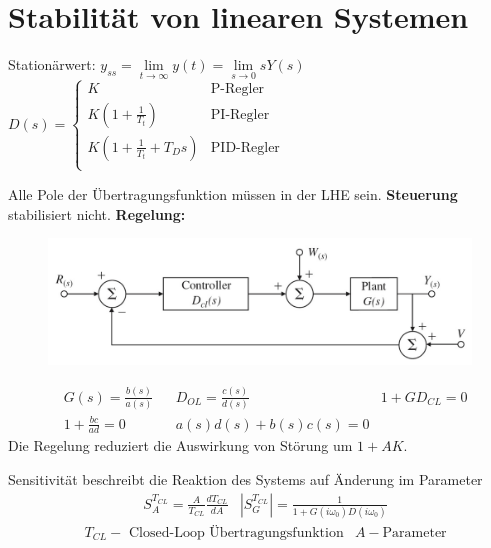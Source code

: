 \setcounter{section}{5}
\section{Stabilität von linearen Systemen}
\begin{tcolorbox}[colback=white!10!white,
                  colframe=green!30!black,
                  title=Stationäres Verhalten]
    Stationärwert: $y_{ss} = \lim\limits_{t \rightarrow \infty}y\left(t\right)
                           = \lim\limits_{s \rightarrow 0}sY\left(s\right)$ \\
    $D\left(s\right) = \begin{cases}
        K & \text{P-Regler} \\
        K\left(1+\frac{1}{T_t}\right) & \text{PI-Regler} \\
        K\left(1+\frac{1}{T_t}+T_Ds\right) & \text{PID-Regler} \\
    \end{cases}$
\end{tcolorbox}

\begin{tcolorbox}[colback=white!10!white,
                  colframe=green!30!black,
                  title=Stabilität]
    Alle Pole der Übertragungsfunktion müssen in der LHE sein.
    \textbf{Steuerung} stabilisiert nicht.
    \textbf{Regelung:}
    \begin{figure}[H]
        \centering
        \includegraphics[width=.7\textwidth]{images/regler}
    \end{figure}
    \begin{align*}
        &G(s) = \frac{b(s)}{a(s)}  && D_{OL} = \frac{c(s)}{d(s)}
        &1+ G D_{CL} = 0\\ 
        &1 + \frac{bc}{ad} = 0  &&
        a(s)d(s) + b(s)c(s) = 0 
    \end{align*}
    Die Regelung reduziert die Auswirkung von Störung um $1+ AK$.
\end{tcolorbox}



\begin{tcolorbox}[colback=white!10!white,colframe=green!30!black,title=Sensitivität] 
    Sensitivität beschreibt die Reaktion des Systems auf Änderung im Parameter
    \begin{align*}
        & S_{A}^{T_{CL}} = \frac{A}{T_{CL}}\frac{d T_{CL}}{dA}
        & |S_{G}^{T_{CL}}| = \frac{1}{1+G(i\omega_0)D(i\omega_0)}
        \end{align*}
    \begin{align*}
        &T_{CL} -\text{ Closed-Loop Übertragungsfunktion} & A - \text{Parameter}
    \end{align*}
\end{tcolorbox}


